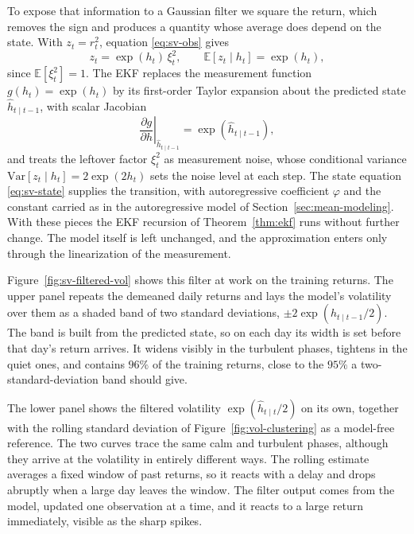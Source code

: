 To expose that information to a Gaussian filter we square the return, which removes the sign and produces a quantity whose average does depend on the state. With $z_t = r_t^2$, equation \eqref{eq:sv-obs} gives
\begin{equation}\label{eq:sv-sq}
  z_t = \exp(h_t)\,\xi_t^2,
  \qquad \mathbb{E}[z_t \mid h_t] = \exp(h_t),
\end{equation}
since $\mathbb{E}[\xi_t^2]=1$. The EKF replaces the measurement function $g(h_t)=\exp(h_t)$ by its first-order Taylor expansion about the predicted state $\hat{h}_{t\mid t-1}$, with scalar Jacobian
\begin{equation}\label{eq:sv-jacobian}
  \left.\frac{\partial g}{\partial h}\right|_{\hat{h}_{t\mid t-1}}
  = \exp\left(\hat{h}_{t\mid t-1}\right),
\end{equation}
and treats the leftover factor $\xi_t^2$ as measurement noise, whose conditional variance $\mathrm{Var}[z_t \mid h_t] = 2\exp(2h_t)$ sets the noise level at each step. The state equation \eqref{eq:sv-state} supplies the transition, with autoregressive coefficient $\varphi$ and the constant carried as in the autoregressive model of Section~\ref{sec:mean-modeling}. With these pieces the EKF recursion of Theorem~\ref{thm:ekf} runs without further change. The model itself is left unchanged, and the approximation enters only through the linearization of the measurement.

Figure~\ref{fig:sv-filtered-vol} shows this filter at work on the training returns. The upper panel repeats the demeaned daily returns and lays the model's volatility over them as a shaded band of two standard deviations, $\pm 2\exp(\hat{h}_{t \mid t-1}/2)$. The band is built from the predicted state, so on each day its width is set before that day's return arrives. It widens visibly in the turbulent phases, tightens in the quiet ones, and contains $96\%$ of the training returns, close to the $95\%$ a two-standard-deviation band should give.

The lower panel shows the filtered volatility $\exp(\hat{h}_{t \mid t}/2)$ on its own, together with the rolling standard deviation of Figure~\ref{fig:vol-clustering} as a model-free reference. The two curves trace the same calm and turbulent phases, although they arrive at the volatility in entirely different ways. The rolling estimate averages a fixed window of past returns, so it reacts with a delay and drops abruptly when a large day leaves the window. The filter output comes from the model, updated one observation at a time, and it reacts to a large return immediately, visible as the sharp spikes.

